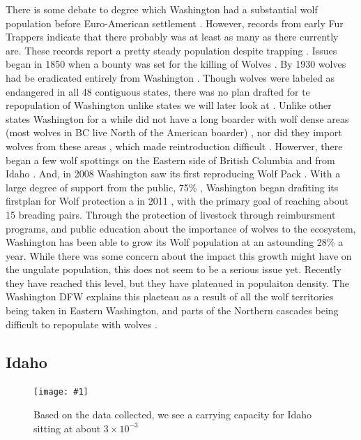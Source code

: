 \documentclass[12pt]{article}
\newcommand{\rimage}[2]{
\begin{figure}
    \begin{center}
\texttt{[image: \#1]}
\caption{#2}
    \end{center}
\end{figure}
}
\begin{document}
There is some debate to degree which Washington had a substantial wolf population before Euro-American settlement \cite{WPWA}.
However, records from early Fur Trappers indicate that there probably was at least as many as there currently are.
These records report a pretty steady population despite trapping \cite{WPWA}.
Issues began in 1850 \cite{NHWA} when a bounty was set for the killing of Wolves \cite{WPWA}.
By 1930 wolves had be eradicated entirely from Washington \cite{NHWA}.
Though wolves were labeled as endangered in all 48 contiguous states, 
there was no plan drafted for te repopulation of Washington unlike states we will later look at \cite{2018VideoWA}.
Unlike other states Washington for a while did not have a long boarder with wolf dense areas  
    (most wolves in BC live North of the American boarder) \cite{NHWA},
    nor did they import wolves from these areas \cite{2018VideoWA},
    which made reintroduction difficult \cite{WPWA}. 
Howerver, there began a few wolf spottings on the Eastern side of British Columbia and from Idaho \cite{WPWA}.
And, in 2008  Washington saw its first reproducing Wolf Pack \cite{NHWA}.
With a large degree of support from the public, 75\% \cite{WPWA},
Washington began drafiting its firstplan for Wolf protection a in 2011 \cite{WPWA},
with the primary goal of reaching about 15 breading pairs.
Through the protection of livestock through reimbursment programs,
and public education about the importance of wolves to the ecosystem,
Washington has been able to grow its Wolf population at an astounding 28\% a year.
While there was some concern about the impact this growth might have on the ungulate population,
this does not seem to be a serious issue yet.
Recently they have reached this level,
but they have plateaued in  populaiton density. 
The Washington DFW explains this plaeteau as a result of all the wolf territories being taken in Eastern Washington,
and parts of the Northern cascades being difficult to repopulate with wolves \cite{2018VideoWA}.

\subsection{Idaho}
\rimage{idaho.png}{Based on the data collected, we see a carrying capacity for Idaho sitting at about $3 \times 10^{-3}$ }
\end{document}
